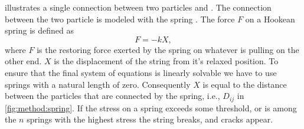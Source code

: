 
 illustrates a single connection between two particles  and . The connection between the two particle is modeled with the spring . The force $F$ on a Hookean spring is defined as
\begin{equation}\label{eq:method:hookeslaw}
	F = -k X,	
\end{equation}
where $F$ is the restoring force exerted by the spring on whatever is pulling on the other end. $X$ is the displacement of the string from it's relaxed position. To ensure that the final system of equations is linearly solvable we have to use springs with a natural length of zero. Consequently $X$ is equal to the distance between the particles that are connected by the spring, i.e., $D_{ij}$ in \cref{fig:method:spring}. If the stress on a spring exceeds some threshold, or is among the $n$ springs with the highest stress the string breaks, and cracks appear.

